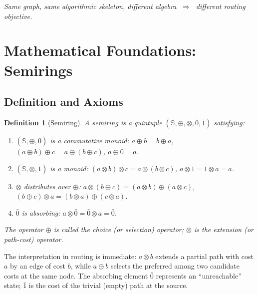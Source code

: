 \documentclass[12pt,a4paper]{article}
\newtheorem{definition}{Definition}[section]
\newcommand{\SR}{\mathbb{S}}
\newcommand{\Rzero}{\bar{0}}
\newcommand{\Rone}{\bar{1}}
\newcommand{\opl}{\oplus}
\newcommand{\otm}{\otimes}
\begin{document}
\begin{mdframed}[linewidth=1.2pt, linecolor=black,
                 backgroundcolor=gray!8,
                 innertopmargin=10pt, innerbottommargin=10pt,
                 innerleftmargin=14pt, innerrightmargin=14pt]
  \centering
  \textit{Same graph, same algorithmic skeleton, different algebra
  $\;\Longrightarrow\;$ different routing objective.}
\end{mdframed}
\vspace{0.5em}

\section{Mathematical Foundations: Semirings}
\label{sec:semirings}

\subsection{Definition and Axioms}

\begin{definition}[Semiring]
  A \emph{semiring} is a quintuple $(\SR, \opl, \otm, \Rzero, \Rone)$
  satisfying:
  \begin{enumerate}
    \item $(\SR, \opl, \Rzero)$ is a commutative monoid:
          $a \opl b = b \opl a$,\; $(a \opl b) \opl c = a \opl (b \opl c)$,\;
          $a \opl \Rzero = a$.
    \item $(\SR, \otm, \Rone)$ is a monoid:
          $(a \otm b) \otm c = a \otm (b \otm c)$,\;
          $a \otm \Rone = \Rone \otm a = a$.
    \item $\otm$ distributes over $\opl$:
          $a \otm (b \opl c) = (a \otm b) \opl (a \otm c)$,\;
          $(b \opl c) \otm a = (b \otm a) \opl (c \otm a)$.
    \item $\Rzero$ is absorbing: $a \otm \Rzero = \Rzero \otm a = \Rzero$.
  \end{enumerate}
  The operator $\opl$ is called the \emph{choice} (or \emph{selection})
  operator; $\otm$ is the \emph{extension} (or \emph{path-cost}) operator.
\end{definition}

The interpretation in routing is immediate: $a \otm b$ extends a partial
path with cost $a$ by an edge of cost $b$, while $a \opl b$ selects the
preferred among two candidate costs at the same node.  The absorbing element
$\Rzero$ represents an ``unreachable'' state; $\Rone$ is the cost of the
trivial (empty) path at the source.
\end{document}
